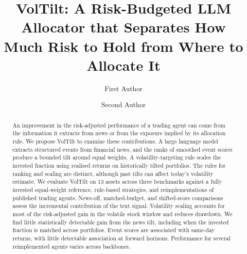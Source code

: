 \documentclass[runningheads]{llncs}
\begin{document}
%
\title{VolTilt: A Risk-Budgeted LLM Allocator that Separates How Much Risk to Hold from Where to Allocate It}
%
%
\author{First Author \and Second Author}
%
%
%
\maketitle
%
\begin{abstract}
An improvement in the risk-adjusted performance of a trading agent can come from the information it extracts from news or from the exposure implied by its allocation rule. We propose VolTilt to examine these contributions. A large language model extracts structured events from financial news, and the ranks of smoothed event scores produce a bounded tilt around equal weights. A volatility-targeting rule scales the invested fraction using realised returns on historically tilted portfolios. The rules for ranking and scaling are distinct, although past tilts can affect today's volatility estimate. We evaluate VolTilt on 13 assets across three benchmarks against a fully invested equal-weight reference, rule-based strategies, and reimplementations of published trading agents. News-off, matched-budget, and shifted-score comparisons assess the incremental contribution of the text signal. Volatility scaling accounts for most of the risk-adjusted gain in the volatile stock window and reduces drawdown. We find little statistically detectable gain from the news tilt, including when the invested fraction is matched across portfolios. Event scores are associated with same-day returns, with little detectable association at forward horizons. Performance for several reimplemented agents varies across backbones.
\end{abstract}
%







%


%
\end{document}
